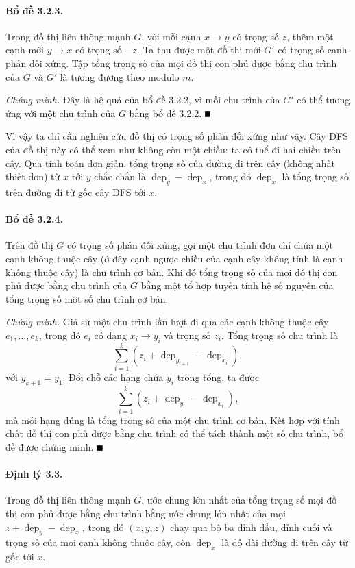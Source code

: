 \documentclass[11pt]{article}
\providecommand{\square}{\mathord{\vcenter{\hrule height .6em width .6em}}}
\begin{document}
\paragraph{Bổ đề 3.2.3.}
Trong đồ thị liên thông mạnh $G$, với mỗi cạnh $x\to y$ có trọng số $z$, thêm
một cạnh mới $y\to x$ có trọng số $-z$. Ta thu được một đồ thị mới $G'$ có
trọng số cạnh phản đối xứng. Tập tổng trọng số của mọi đồ thị con phủ được bằng
chu trình của $G$ và $G'$ là tương đương theo modulo $m$.

\emph{Chứng minh.}
Đây là hệ quả của bổ đề 3.2.2, vì mỗi chu trình của $G'$ có thể tương ứng với
một chu trình của $G$ bằng bổ đề 3.2.2. \hfill$\square$

Vì vậy ta chỉ cần nghiên cứu đồ thị có trọng số phản đối xứng như vậy. Cây DFS
của đồ thị này có thể xem như không còn một chiều: ta có thể đi hai chiều trên
cây. Qua tính toán đơn giản, tổng trọng số của đường đi trên cây (không nhất
thiết đơn) từ $x$ tới $y$ chắc chắn là $\operatorname{dep}_y-\operatorname{dep}_x$,
trong đó $\operatorname{dep}_x$ là tổng trọng số trên đường đi từ gốc cây DFS
tới $x$.

\paragraph{Bổ đề 3.2.4.}
Trên đồ thị $G$ có trọng số phản đối xứng, gọi một chu trình đơn chỉ chứa một
cạnh không thuộc cây (ở đây cạnh ngược chiều của cạnh cây không tính là cạnh
không thuộc cây) là chu trình cơ bản. Khi đó tổng trọng số của mọi đồ thị con
phủ được bằng chu trình của $G$ bằng một tổ hợp tuyến tính hệ số nguyên của tổng
trọng số một số chu trình cơ bản.

\emph{Chứng minh.}
Giả sử một chu trình lần lượt đi qua các cạnh không thuộc cây
$e_1,\ldots,e_k$, trong đó $e_i$ có dạng $x_i\to y_i$ và trọng số $z_i$. Tổng
trọng số chu trình là
\[
\sum_{i=1}^k (z_i+\operatorname{dep}_{y_{i+1}}-\operatorname{dep}_{x_i}),
\]
với $y_{k+1}=y_1$. Đổi chỗ các hạng chứa $y_i$ trong tổng, ta được
\[
\sum_{i=1}^k (z_i+\operatorname{dep}_{y_i}-\operatorname{dep}_{x_i}),
\]
mà mỗi hạng đúng là tổng trọng số của một chu trình cơ bản. Kết hợp với tính
chất đồ thị con phủ được bằng chu trình có thể tách thành một số chu trình, bổ
đề được chứng minh. \hfill$\square$

\paragraph{Định lý 3.3.}
Trong đồ thị liên thông mạnh $G$, ước chung lớn nhất của tổng trọng số mọi đồ
thị con phủ được bằng chu trình bằng ước chung lớn nhất của mọi
$z+\operatorname{dep}_y-\operatorname{dep}_x$, trong đó $(x,y,z)$ chạy qua bộ ba
đỉnh đầu, đỉnh cuối và trọng số của mọi cạnh không thuộc cây, còn
$\operatorname{dep}_x$ là độ dài đường đi trên cây từ gốc tới $x$.
\end{document}
